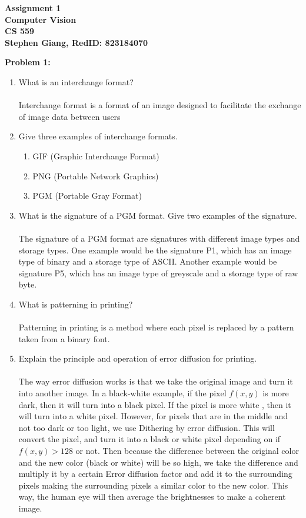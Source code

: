 \documentclass[11pt]{article}
\newenvironment{problem}[1]{\textbf{Problem #1: }}{\newpage}
\begin{document}
	
	\begin{center}
		\textbf{Assignment 1} \\
		\textbf{Computer Vision} \\
		\textbf{CS 559} \\
		\textbf{Stephen Giang, RedID: 823184070} \\
	\end{center}

	\begin{problem}{1}
		\begin{enumerate}[label = (\alph*)]
			\item What is an interchange format? 
			\\ \\
			Interchange format is a format of an image designed to facilitate the exchange of image data between users
			\item Give three examples of interchange formats.
				\begin{enumerate}[label = (\roman*)]
					\item GIF (Graphic Interchange Format) 
					\item PNG (Portable Network Graphics)
					\item PGM (Portable Gray Format)
				\end{enumerate}
			\item What is the signature of a PGM format. Give two examples of the signature.
			\\ \\
			The signature of a PGM format are signatures with different image types and storage types. One example would be the signature P1, which has an image type of binary and a storage type of ASCII.  Another example would be signature P5, which has an image type of greyscale and a storage type of raw byte.
			\item What is patterning in printing? 
			\\ \\
			Patterning in printing is a method where each pixel is replaced by a pattern taken from a binary font.
			\item Explain the principle and operation of error diffusion for printing.
			\\ \\
			The way error diffusion works is that we take the original image and turn it into another image.  In a black-white example, if the pixel $f(x,y)$ is more dark, then it will turn into a black pixel.  If the pixel is more white , then it will turn into a white pixel.  However, for pixels that are in the middle and not too dark or too light, we use Dithering by error diffusion.  This will convert the pixel, and turn it into a black or white pixel depending on if $f(x,y) > 128$ or not.  Then because the difference between the original color and the new color (black or white) will be so high, we take the difference and multiply it by a certain Error diffusion factor and add it to the surrounding pixels making the surrounding pixels a similar color to the new color.  This way, the human eye will then average the brightnesses to make a coherent image.
		\end{enumerate}
	\end{problem}
\end{document}
